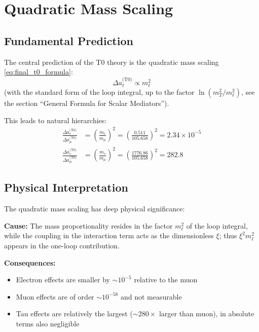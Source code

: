 	\section{Quadratic Mass Scaling}
	
	\subsection{Fundamental Prediction}
	
	The central prediction of the T0 theory is the quadratic mass scaling \eqref{eq:final_t0_formula}:
	\begin{equation}
		\Delta a_\ell^{\text{(T0)}} \propto m_\ell^2
		\label{eq:quadratic_scaling}
	\end{equation}
	(with the standard form of the loop integral, up to the factor $\ln(m_T^2/m_\ell^2)$, see the section \enquote{General Formula for Scalar Mediators}).
	
	This leads to natural hierarchies:
	\begin{align}
		\frac{\Delta a_e^{\text{(T0)}}}{\Delta a_\mu^{\text{(T0)}}} 
		&= \left(\frac{m_e}{m_\mu}\right)^2 
		= \left(\frac{0.511}{105.658}\right)^2 
		= 2.34 \times 10^{-5} \label{eq:electron_muon_ratio} \\
		\frac{\Delta a_\tau^{\text{(T0)}}}{\Delta a_\mu^{\text{(T0)}}} 
		&= \left(\frac{m_\tau}{m_\mu}\right)^2 
		= \left(\frac{1776.86}{105.658}\right)^2 
		= 282.8 \label{eq:tau_muon_ratio}
	\end{align}
	
	\subsection{Physical Interpretation}
	
	The quadratic mass scaling has deep physical significance:
	
	\textbf{Cause:} The mass proportionality resides in the factor $m_\ell^2$ of the loop integral, while the coupling in the interaction term acts as the dimensionless $\xi$; thus $\xi^2 m_\ell^2$ appears in the one-loop contribution.
	
	\textbf{Consequences:}
	\begin{itemize}
		\item Electron effects are smaller by $\sim 10^{-5}$ relative to the muon
		\item Muon effects are of order $\sim 10^{-58}$ and not measurable
		\item Tau effects are relatively the largest ($\sim 280 \times$ larger than muon), in absolute terms also negligible
	\end{itemize}
	
